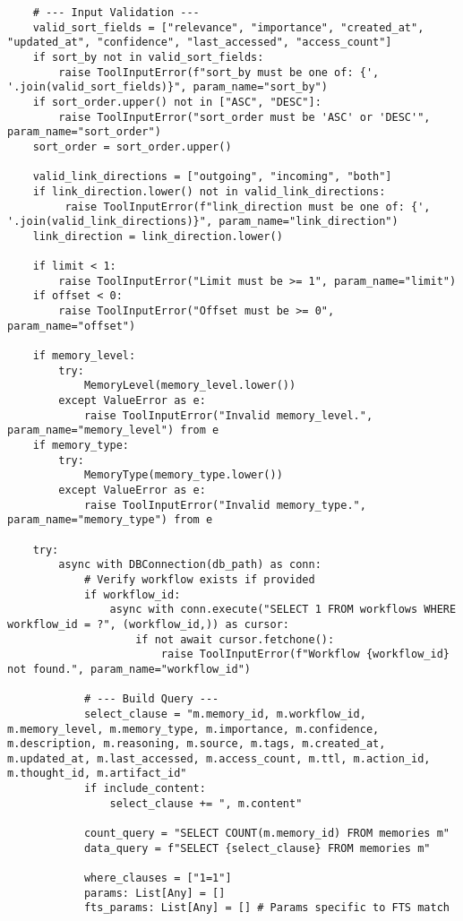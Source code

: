 \documentclass[12pt,a4paper]{article}
\begin{document}
\begin{pageablecode}
\begin{verbatim}
    # --- Input Validation ---
    valid_sort_fields = ["relevance", "importance", "created_at", "updated_at", "confidence", "last_accessed", "access_count"]
    if sort_by not in valid_sort_fields:
        raise ToolInputError(f"sort_by must be one of: {', '.join(valid_sort_fields)}", param_name="sort_by")
    if sort_order.upper() not in ["ASC", "DESC"]:
        raise ToolInputError("sort_order must be 'ASC' or 'DESC'", param_name="sort_order")
    sort_order = sort_order.upper()

    valid_link_directions = ["outgoing", "incoming", "both"]
    if link_direction.lower() not in valid_link_directions:
         raise ToolInputError(f"link_direction must be one of: {', '.join(valid_link_directions)}", param_name="link_direction")
    link_direction = link_direction.lower()

    if limit < 1:
        raise ToolInputError("Limit must be >= 1", param_name="limit")
    if offset < 0:
        raise ToolInputError("Offset must be >= 0", param_name="offset")

    if memory_level:
        try:
            MemoryLevel(memory_level.lower())
        except ValueError as e:
            raise ToolInputError("Invalid memory_level.", param_name="memory_level") from e
    if memory_type:
        try:
            MemoryType(memory_type.lower())
        except ValueError as e:
            raise ToolInputError("Invalid memory_type.", param_name="memory_type") from e

    try:
        async with DBConnection(db_path) as conn:
            # Verify workflow exists if provided
            if workflow_id:
                async with conn.execute("SELECT 1 FROM workflows WHERE workflow_id = ?", (workflow_id,)) as cursor:
                    if not await cursor.fetchone():
                        raise ToolInputError(f"Workflow {workflow_id} not found.", param_name="workflow_id")

            # --- Build Query ---
            select_clause = "m.memory_id, m.workflow_id, m.memory_level, m.memory_type, m.importance, m.confidence, m.description, m.reasoning, m.source, m.tags, m.created_at, m.updated_at, m.last_accessed, m.access_count, m.ttl, m.action_id, m.thought_id, m.artifact_id"
            if include_content:
                select_clause += ", m.content"

            count_query = "SELECT COUNT(m.memory_id) FROM memories m"
            data_query = f"SELECT {select_clause} FROM memories m"

            where_clauses = ["1=1"]
            params: List[Any] = []
            fts_params: List[Any] = [] # Params specific to FTS match


\end{verbatim}
\end{pageablecode}
\end{document}
